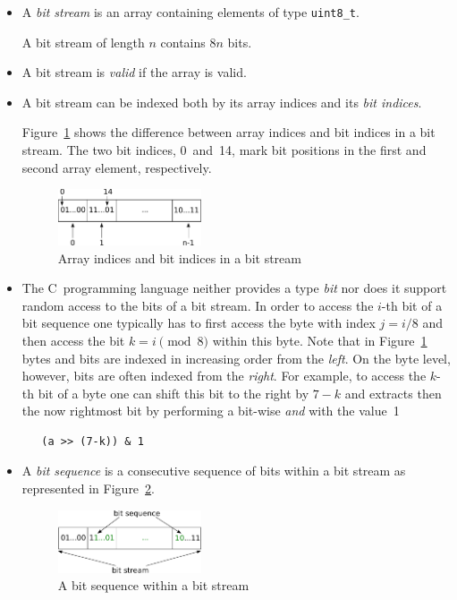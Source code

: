 \begin{itemize}
\item
A \emph{bit stream} is an array containing elements of type \verb"uint8_t".

A bit stream of length $n$ contains $8n$ bits.

\item
A bit stream is \emph{valid} if the array is valid.

\item 
A bit stream can be indexed both by its array indices
and its \emph{bit indices}.

Figure~\ref{fig:bitstream-indices} shows the difference between 
array indices and bit indices in a bit stream.
The two bit indices, 0~and~14,
mark bit positions in the first and second array element, respectively.

\begin{figure}[hbt]
\begin{center}
\includegraphics[width=0.40\textwidth]{figures/array_as_stream.pdf}
\caption{\label{fig:bitstream-indices} Array indices and bit indices in a bit stream}
\end{center}
\end{figure}

\item 
The C~programming language neither provides a type \emph{bit}
nor does it support random access to the bits of a bit stream.
In order to access the $i$-th bit of a bit sequence one typically
has to first access the byte with index $j = i/8$ and then access the 
bit $k = i \pmod{8}$ within this byte.
Note that in Figure~\ref{fig:bitstream-indices} 
bytes and bits are indexed in increasing order from the \emph{left}.
On the byte level, however, bits are often indexed from the \emph{right}.
For example, to access the $k$-th bit of a byte  one can
shift this bit to the right by $7-k$ and extracts then the now
rightmost bit by performing a bit-wise \emph{and} with the value~1
%
\begin{verbatim}
   (a >> (7-k)) & 1
\end{verbatim}

\item
A \emph{bit sequence} is a consecutive sequence of bits within a bit stream
as represented in Figure~\ref{fig:bitsequence}.
\begin{figure}[hbt]
\begin{center}
\includegraphics[width=0.40\textwidth]{figures/bit_sequence.pdf}
\caption{\label{fig:bitsequence} A bit sequence within a bit stream}
\end{center}
\end{figure}


\end{itemize}
